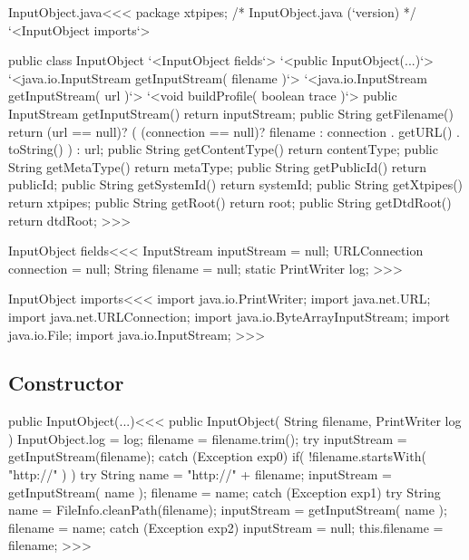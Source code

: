 \documentclass{article}
\begin{document}


\<InputObject.java\><<<
package xtpipes;
/*
InputObject.java (`version)
*/
`<InputObject imports`>

public class InputObject{
      `<InputObject fields`>
   `<public InputObject(...)`>
   `<java.io.InputStream getInputStream( filename )`>
   `<java.io.InputStream getInputStream( url )`>
   `<void buildProfile( boolean trace )`>
   public InputStream getInputStream(){ return inputStream; }
   public String getFilename(){
      return (url == null)?
         ( (connection == null)? filename 
                               :
                                 connection . getURL() . toString()
         )
       : url;
   }
   public String getContentType(){ return contentType; }
   public String getMetaType(){ return metaType; }
   public String getPublicId(){ return publicId; }
   public String getSystemId(){ return systemId; }
   public String getXtpipes(){ return xtpipes; }
   public String getRoot(){ return root; }
   public String getDtdRoot(){ return dtdRoot; }
}
>>>

\<InputObject fields\><<<
InputStream inputStream = null;
URLConnection connection = null;
String filename = null;
static PrintWriter log;
>>>

\<InputObject imports\><<<
import java.io.PrintWriter;
import java.net.URL;
import java.net.URLConnection;
import java.io.ByteArrayInputStream;
import java.io.File;
import java.io.InputStream;
>>>

\subsection{Constructor}




\<public InputObject(...)\><<<
public InputObject( String filename, PrintWriter log ){
   InputObject.log = log;
   filename = filename.trim(); 
   try{ 
      inputStream = getInputStream(filename); 
   } catch (Exception exp0){ 
      if( !filename.startsWith( "http://" ) ){ 
         try{ 
            String name = "http://" + filename;
            inputStream = getInputStream( name ); 
            filename = name; 
         } catch (Exception exp1){ 
            try{  
               String name = FileInfo.cleanPath(filename);
               inputStream = getInputStream( name ); 
               filename = name; 
            } catch (Exception exp2){ inputStream = null; } 
   }  }  }  
   this.filename = filename;
}
>>>
\end{document}
